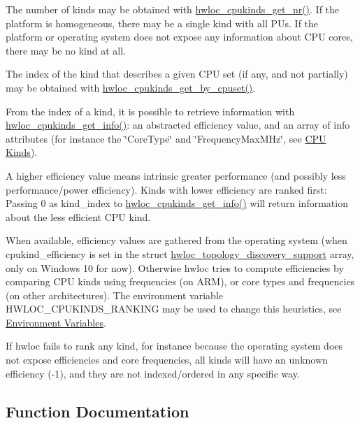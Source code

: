The number of kinds may be obtained with \hyperlink{a00213_ga7553f7c6d3920b169f3fc18dfe6a33e3}{hwloc\+\_\+cpukinds\+\_\+get\+\_\+nr()}. If the platform is homogeneous, there may be a single kind with all P\+Us. If the platform or operating system does not expose any information about C\+PU cores, there may be no kind at all.

The index of the kind that describes a given C\+PU set (if any, and not partially) may be obtained with \hyperlink{a00213_gaf979833aab18d2e7f4b17c932cbcf5d8}{hwloc\+\_\+cpukinds\+\_\+get\+\_\+by\+\_\+cpuset()}.

From the index of a kind, it is possible to retrieve information with \hyperlink{a00213_gae1b38fbe9c645583fc16052ce6fbb275}{hwloc\+\_\+cpukinds\+\_\+get\+\_\+info()}\+: an abstracted efficiency value, and an array of info attributes (for instance the \char`\"{}\+Core\+Type\char`\"{} and \char`\"{}\+Frequency\+Max\+M\+Hz\char`\"{}, see \hyperlink{a00387_topoattrs_cpukinds}{C\+PU Kinds}).

A higher efficiency value means intrinsic greater performance (and possibly less performance/power efficiency). Kinds with lower efficiency are ranked first\+: Passing 0 as {\ttfamily kind\+\_\+index} to \hyperlink{a00213_gae1b38fbe9c645583fc16052ce6fbb275}{hwloc\+\_\+cpukinds\+\_\+get\+\_\+info()} will return information about the less efficient C\+PU kind.

When available, efficiency values are gathered from the operating system (when {\ttfamily cpukind\+\_\+efficiency} is set in the struct \hyperlink{a00290}{hwloc\+\_\+topology\+\_\+discovery\+\_\+support} array, only on Windows 10 for now). Otherwise hwloc tries to compute efficiencies by comparing C\+PU kinds using frequencies (on A\+RM), or core types and frequencies (on other architectures). The environment variable H\+W\+L\+O\+C\+\_\+\+C\+P\+U\+K\+I\+N\+D\+S\+\_\+\+R\+A\+N\+K\+I\+NG may be used to change this heuristics, see \hyperlink{a00382}{Environment Variables}.

If hwloc fails to rank any kind, for instance because the operating system does not expose efficiencies and core frequencies, all kinds will have an unknown efficiency ({\ttfamily -\/1}), and they are not indexed/ordered in any specific way. 

\subsection{Function Documentation}
\mbox{\label{a00213_gaf979833aab18d2e7f4b17c932cbcf5d8}} 
